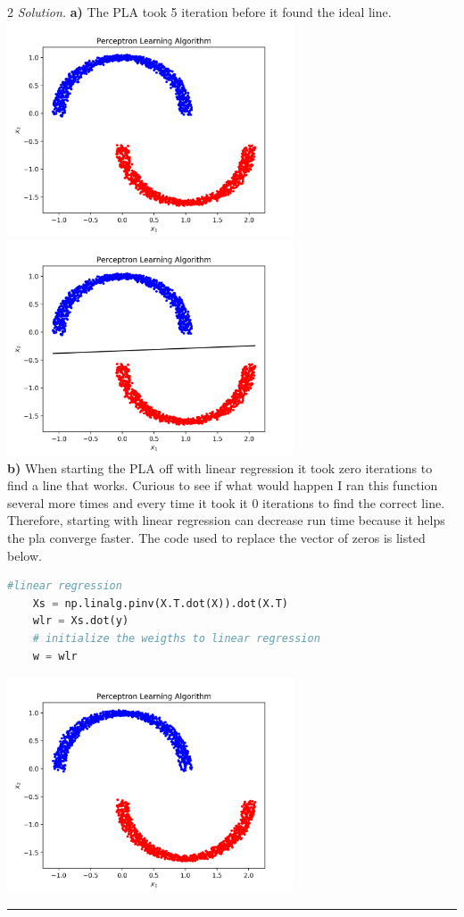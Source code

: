 \documentclass[12pt]{article}
\newcommand{\spacingfactor}{2}
\newcommand\myqed{}                 %
\newcommand{\printmyqed}[1][]       %
  {%
  \ifthenelse{\equal{#1}{Proof}}
  {\renewcommand{\myqed}{\qed}}
  {\renewcommand{\myqed}{}}
  }
\newenvironment{response}[1][\textit{Solution}]{%
  \printmyqed[#1]
  \begin{spacing}{\spacingfactor}
  \medskip                          %
  \noindent \textit{#1.}}{\myqed\end{spacing}\medskip\hrule}
\begin{document}
\begin{response}[Solution] 
\textbf{a)} The PLA took 5 iteration before it found the ideal line.\\
\includegraphics[width=85mm]{3a_3.png} 
\includegraphics[width=85mm]{3a_4.png} 
\\
\textbf{b)} When starting the PLA off with linear regression 
it took zero iterations to find a line that works. Curious
to see if what would happen I ran this function several more 
times and every time it took it 0 iterations to find the correct 
line. Therefore, starting with linear regression can decrease 
run time because it helps the pla converge faster.  The code 
used to replace the vector of zeros is listed below. \\
\lstset{language=Matlab,breaklines=true,basicstyle=\small\ttfamily}
  \begin{lstlisting}[language=Python,frame=single]
    #linear regression
    Xs = np.linalg.pinv(X.T.dot(X)).dot(X.T) 
    wlr = Xs.dot(y)
    # initialize the weigths to linear regression 
    w = wlr
  \end{lstlisting}
\includegraphics[width=85mm]{3b_2.png} 

\end{response}
\end{document}
